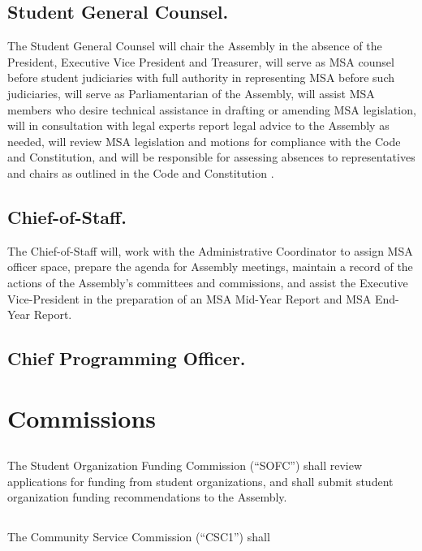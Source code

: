 \subsection{Student General Counsel.}
The Student General Counsel will chair the Assembly in the absence of the President, Executive Vice President and Treasurer, will serve as MSA counsel before student judiciaries with  full authority in representing MSA before such judiciaries, will serve as Parliamentarian of the Assembly, will assist MSA members who desire technical assistance in drafting or amending MSA legislation, will in consultation with legal experts report legal advice to the Assembly as needed, will review MSA legislation and motions for compliance with the Code and Constitution, and will be responsible for assessing absences to representatives and chairs as outlined in the Code and Constitution .

\subsection{Chief-of-Staff.}
The Chief-of-Staff will, work with the Administrative Coordinator to assign MSA officer space, prepare the agenda for Assembly meetings, maintain a record of the actions of the Assembly's committees and commissions, and assist the Executive Vice-President in the preparation of an MSA Mid-Year Report and MSA End-Year Report.

\subsection{Chief Programming Officer.}


\section{Commissions}

\subsection{}
The Student Organization Funding Commission (``SOFC'') shall review applications for funding from student organizations, and shall submit student organization funding recommendations to the Assembly.

\subsection{}
The Community Service Commission (``CSC1'') shall 
